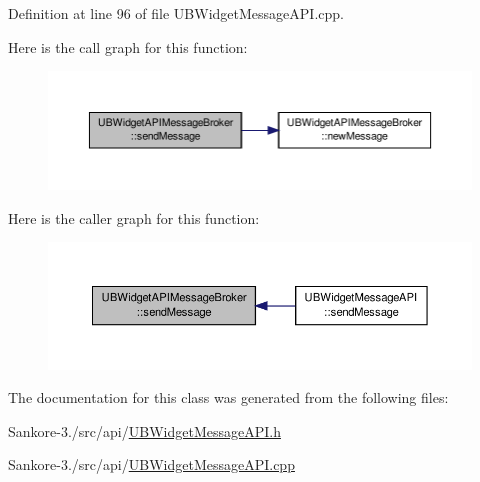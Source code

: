 Definition at line 96 of file U\-B\-Widget\-Message\-A\-P\-I.\-cpp.



Here is the call graph for this function\-:
\nopagebreak
\begin{figure}[H]
\begin{center}
\leavevmode
\includegraphics[width=350pt]{d2/d5c/class_u_b_widget_a_p_i_message_broker_abcefec69dc208159e89a6f53b834ad54_cgraph}
\end{center}
\end{figure}




Here is the caller graph for this function\-:
\nopagebreak
\begin{figure}[H]
\begin{center}
\leavevmode
\includegraphics[width=350pt]{d2/d5c/class_u_b_widget_a_p_i_message_broker_abcefec69dc208159e89a6f53b834ad54_icgraph}
\end{center}
\end{figure}




The documentation for this class was generated from the following files\-:\begin{DoxyCompactItemize}
\item 
Sankore-\/3./src/api/\hyperlink{_u_b_widget_message_a_p_i_8h}{U\-B\-Widget\-Message\-A\-P\-I.\-h}\item 
Sankore-\/3./src/api/\hyperlink{_u_b_widget_message_a_p_i_8cpp}{U\-B\-Widget\-Message\-A\-P\-I.\-cpp}\end{DoxyCompactItemize}
